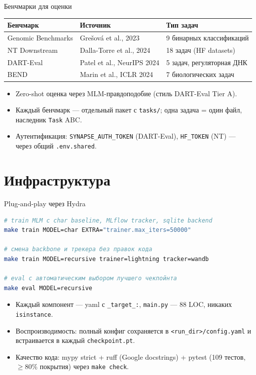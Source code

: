 \documentclass[aspectratio=169,xcolor=table]{beamer}
\begin{document}
\begin{frame}{Бенчмарки для оценки}
  \begin{tabular}{@{}lll@{}}
    \toprule
    Бенчмарк & Источник & Тип задач \\
    \midrule
    Genomic Benchmarks & Grešová et al., 2023 & 9 бинарных классификаций \\
    NT Downstream      & Dalla-Torre et al., 2024 & 18 задач (HF datasets) \\
    DART-Eval          & Patel et al., NeurIPS 2024 & 5 задач, регуляторная ДНК \\
    BEND               & Marin et al., ICLR 2024  & 7 биологических задач \\
    \bottomrule
  \end{tabular}
  \medskip
  \begin{itemize}
    \item Zero-shot оценка через MLM-правдоподобие
          (стиль DART-Eval Tier A).
    \item Каждый бенчмарк --- отдельный пакет с \texttt{tasks/}; одна
          задача = один файл, наследник \texttt{Task} ABC.
    \item Аутентификация: \texttt{SYNAPSE\_AUTH\_TOKEN} (DART-Eval),
          \texttt{HF\_TOKEN} (NT) --- через общий \texttt{.env.shared}.
  \end{itemize}
\end{frame}

\section{Инфраструктура}

\begin{frame}[fragile]{Plug-and-play через Hydra}
\begin{lstlisting}[language=bash]
# train MLM с char baseline, MLflow tracker, sqlite backend
make train MODEL=char EXTRA="trainer.max_iters=50000"

# смена backbone и трекера без правок кода
make train MODEL=recursive trainer=lightning tracker=wandb

# eval с автоматическим выбором лучшего чекпойнта
make eval MODEL=recursive
\end{lstlisting}
  \begin{itemize}
    \item Каждый компонент --- yaml с \texttt{\_target\_:},
          \texttt{main.py} --- 88 LOC, никаких \texttt{isinstance}.
    \item Воспроизводимость: полный конфиг сохраняется в
          \texttt{<run\_dir>/config.yaml} и встраивается в каждый
          \texttt{checkpoint.pt}.
    \item Качество кода: mypy strict + ruff (Google docstrings) +
          pytest (109 тестов, $\ge 80\%$ покрытия) через \texttt{make check}.
  \end{itemize}
\end{frame}
\end{document}
